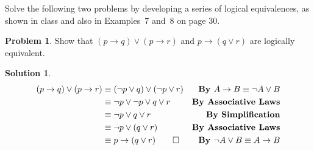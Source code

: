 \documentclass{article}
\theoremstyle{definition}
\newtheorem{problem}{Problem}
\newtheorem*{solution}{Solution}
\begin{document}
\noindent
Solve the following two problems by developing a series of logical equivalences, 
as shown in class and also in Examples~7 and~8 on page 30.

\begin{problem} Show that $(p\rightarrow q) \lor (p\rightarrow r)$ and 
$p\rightarrow (q\lor r)$ are logically equivalent. 
\end{problem}
\begin{solution}
  \begin{align*}
    (p\rightarrow q) \lor (p\rightarrow r) &\equiv (\neg p \lor q) \lor (\neg p \lor r) &\textbf{By $A \rightarrow B \equiv \neg A \lor B$} \\
  &\equiv \neg p \lor \neg p \lor q \lor r &\textbf{By Associative Laws} \\
      &\equiv \neg p \lor q \lor r & \textbf{By Simplification} \\
      &\equiv \neg p \lor (q \lor r) &\textbf{By Associative Laws} \\
      &\equiv p \rightarrow (q \lor r) \qed &\textbf{By $\neg A \lor B \equiv A \rightarrow B$}
  \end{align*}
\end{solution}
\end{document}
